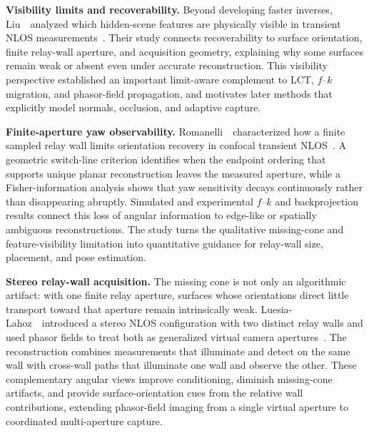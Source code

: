 \vspace{0.8mm}
\noindent \textbf{Visibility limits and recoverability.}
Beyond developing faster inverses, Liu~\etal~analyzed which hidden-scene features are physically visible in transient NLOS measurements~\cite{liuAnalysisFeatureVisibility2019}. Their study connects recoverability to surface orientation, finite relay-wall aperture, and acquisition geometry, explaining why some surfaces remain weak or absent even under accurate reconstruction. This visibility perspective established an important limit-aware complement to LCT, $f$--$k$ migration, and phasor-field propagation, and motivates later methods that explicitly model normals, occlusion, and adaptive capture.

\vspace{0.8mm}
\noindent \textbf{Finite-aperture yaw observability.}
Romanelli~\etal~characterized how a finite sampled relay wall limits orientation recovery in confocal transient NLOS~\cite{romanelliFiniteApertureYawNLOS2026}. A geometric switch-line criterion identifies when the endpoint ordering that supports unique planar reconstruction leaves the measured aperture, while a Fisher-information analysis shows that yaw sensitivity decays continuously rather than disappearing abruptly. Simulated and experimental $f$--$k$ and backprojection results connect this loss of angular information to edge-like or spatially ambiguous reconstructions. The study turns the qualitative missing-cone and feature-visibility limitation into quantitative guidance for relay-wall size, placement, and pose estimation.

\vspace{0.8mm}
\noindent \textbf{Stereo relay-wall acquisition.}
The missing cone is not only an algorithmic artifact: with one finite relay aperture, surfaces whose orientations direct little transport toward that aperture remain intrinsically weak. Luesia-Lahoz~\etal~introduced a stereo NLOS configuration with two distinct relay walls and used phasor fields to treat both as generalized virtual camera apertures~\cite{luesiaStereoNLOS2026}. The reconstruction combines measurements that illuminate and detect on the same wall with cross-wall paths that illuminate one wall and observe the other. These complementary angular views improve conditioning, diminish missing-cone artifacts, and provide surface-orientation cues from the relative wall contributions, extending phasor-field imaging from a single virtual aperture to coordinated multi-aperture capture.

